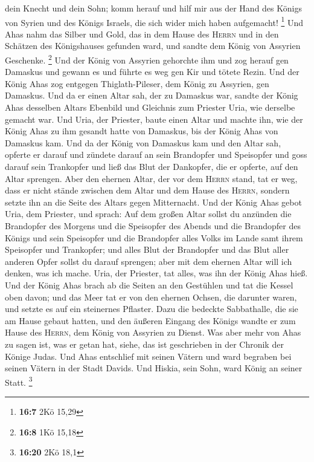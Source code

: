 dein Knecht und dein Sohn; komm herauf und hilf mir aus der Hand des
Königs von Syrien und des Königs Israels, die sich wider mich haben
aufgemacht! \footnote{\textbf{16:7} 2Kö 15,29}  Und Ahas
nahm das Silber und Gold, das in dem Hause des \textsc{Herrn} und in den
Schätzen des Königshauses gefunden ward, und sandte dem König von
Assyrien Geschenke. \footnote{\textbf{16:8} 1Kö 15,18} 
Und der König von Assyrien gehorchte ihm und zog herauf gen Damaskus und
gewann es und führte es weg gen Kir und tötete Rezin. 
Und der König Ahas zog entgegen Thiglath-Pileser, dem König zu Assyrien,
gen Damaskus. Und da er einen Altar sah, der zu Damaskus war, sandte der
König Ahas desselben Altars Ebenbild und Gleichnis zum Priester Uria,
wie derselbe gemacht war.  Und Uria, der Priester, baute
einen Altar und machte ihn, wie der König Ahas zu ihm gesandt hatte von
Damaskus, bis der König Ahas von Damaskus kam.  Und da
der König von Damaskus kam und den Altar sah, opferte er darauf
 und zündete darauf an sein Brandopfer und Speisopfer und
goss darauf sein Trankopfer und ließ das Blut der Dankopfer, die er
opferte, auf den Altar sprengen.  Aber den ehernen Altar,
der vor dem \textsc{Herrn} stand, tat er weg, dass er nicht stände
zwischen dem Altar und dem Hause des \textsc{Herrn}, sondern setzte ihn
an die Seite des Altars gegen Mitternacht.  Und der König
Ahas gebot Uria, dem Priester, und sprach: Auf dem großen Altar sollst
du anzünden die Brandopfer des Morgens und die Speisopfer des Abends und
die Brandopfer des Königs und sein Speisopfer und die Brandopfer alles
Volks im Lande samt ihrem Speisopfer und Trankopfer; und alles Blut der
Brandopfer und das Blut aller anderen Opfer sollst du darauf sprengen;
aber mit dem ehernen Altar will ich denken, was ich mache.
 Uria, der Priester, tat alles, was ihn der König Ahas
hieß.  Und der König Ahas brach ab die Seiten an den
Gestühlen und tat die Kessel oben davon; und das Meer tat er von den
ehernen Ochsen, die darunter waren, und setzte es auf ein steinernes
Pflaster.  Dazu die bedeckte Sabbathalle, die sie am
Hause gebaut hatten, und den äußeren Eingang des Königs wandte er zum
Hause des \textsc{Herrn}, dem König von Assyrien zu Dienst.
 Was aber mehr von Ahas zu sagen ist, was er getan hat,
siehe, das ist geschrieben in der Chronik der Könige Judas.
 Und Ahas entschlief mit seinen Vätern und ward begraben
bei seinen Vätern in der Stadt Davids. Und Hiskia, sein Sohn, ward König
an seiner Statt. \footnote{\textbf{16:20} 2Kö 18,1}

